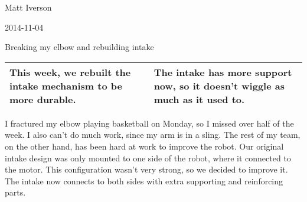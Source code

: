Matt Iverson

2014-11-04

Breaking my elbow and rebuilding intake

\begin{tabular}{|p{5cm}|p{5cm}|}
 \hline
 This week, we rebuilt the intake mechanism to be more durable. &
 The intake has more support now, so it doesn't wiggle as much as it used to. \\
 \hline
\end{tabular}

I fractured my elbow playing basketball on Monday, so I missed over half of the week. I also can't do much work, since my arm is in a sling. The rest of my team, on the other hand, has been hard at work to improve the robot. Our original intake design was only mounted to one side of the robot, where it connected to the motor. This configuration wasn't very strong, so we decided to improve it. The intake now connects to both sides with extra supporting and reinforcing parts.
